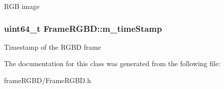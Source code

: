 \-R\-G\-B image \hypertarget{classFrameRGBD_afb47a34f0dc1d8391a91c0170984b84a}{
\subsubsection[{m\-\_\-time\-Stamp}]{\setlength{\rightskip}{0pt plus 5cm}uint64\-\_\-t {\bf \-Frame\-R\-G\-B\-D\-::m\-\_\-time\-Stamp}}}\label{classFrameRGBD_afb47a34f0dc1d8391a91c0170984b84a}
\-Timestamp of the \-R\-G\-B\-D frame 

\-The documentation for this class was generated from the following file\-:\begin{DoxyCompactItemize}
\item 
frame\-R\-G\-B\-D/\-Frame\-R\-G\-B\-D.\-h\end{DoxyCompactItemize}
